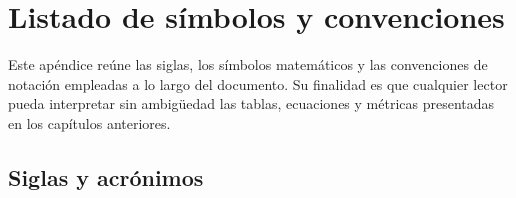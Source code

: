 \chapter{Listado de símbolos y convenciones}\label{listado-de-simbolos-y-convenciones}

Este apéndice reúne las siglas, los símbolos matemáticos y las convenciones de
notación empleadas a lo largo del documento. Su finalidad es que cualquier
lector pueda interpretar sin ambigüedad las tablas, ecuaciones y métricas
presentadas en los capítulos anteriores.

\section*{Siglas y acrónimos}

